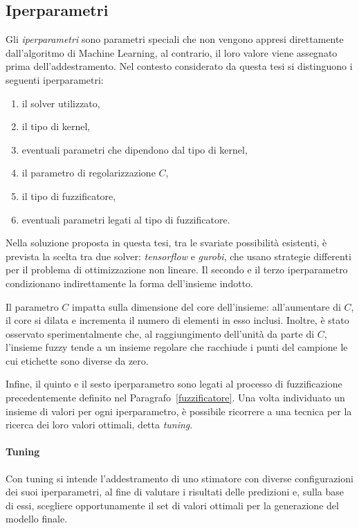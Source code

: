 \documentclass[12pt]{report}
\theoremstyle{definition}
\begin{document}
\subsection{Iperparametri}\label{iperparameters}
Gli \textit{iperparametri} sono parametri speciali che non vengono appresi direttamente dall'algoritmo di Machine Learning, al contrario, il loro valore viene assegnato prima dell'addestramento.
Nel contesto considerato da questa tesi si distinguono i seguenti iperparametri: 
\begin{enumerate}
    \item il solver utilizzato,
    \item il tipo di kernel,
    \item eventuali parametri che dipendono dal tipo di kernel,
    \item il parametro di regolarizzazione $C$,
    \item il tipo di fuzzificatore,
    \item eventuali parametri legati al tipo di fuzzificatore.
\end{enumerate}
Nella soluzione proposta in questa tesi, tra le svariate possibilità esistenti, è prevista la scelta tra due solver: \textit{tensorflow} e \textit{gurobi}, che usano strategie differenti per il problema di ottimizzazione non lineare. Il secondo e il terzo iperparametro condizionano indirettamente la forma dell'insieme indotto.

Il parametro $C$ impatta sulla dimensione del core dell'insieme:
all'aumentare di $C$, il core si dilata e incrementa il numero di elementi in esso inclusi.
Inoltre, è stato osservato sperimentalmente che, al raggiungimento dell'unità da parte di $C$, l'insieme fuzzy tende a un insieme regolare che racchiude i punti del campione le cui etichette sono diverse da zero.

Infine, il quinto e il sesto iperparametro sono legati al processo di fuzzificazione precedentemente definito nel Paragrafo~\ref{fuzzificatore}.
Una volta individuato un insieme di valori per ogni iperparametro, è possibile ricorrere a una tecnica per la ricerca dei loro valori ottimali, detta \textit{tuning}.

\paragraph{Tuning} Con tuning si intende l'addestramento di uno stimatore con diverse configurazioni dei suoi iperparametri, al fine di valutare i risultati delle predizioni e, sulla base di essi, scegliere opportunamente il set di valori ottimali per la generazione del modello finale.
\end{document}
